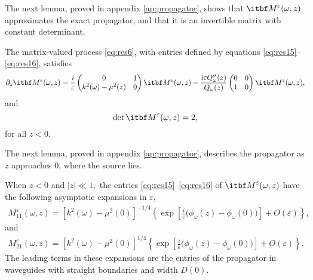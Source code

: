 \documentclass[final]{siamltex}
\begin{document}
The next lemma, proved in appendix \ref{ap:propagator}, shows that
${{\itbf M}}^{\varepsilon}({\omega},z)$ approximates the exact propagator, and that
it is an invertible matrix with constant  determinant.

\vspace{0.05in}
\begin{lemma}
\label{lem.1}
The matrix-valued process \eqref{eq:res6}, with entries defined by
equations \eqref{eq:res15}--\eqref{eq:res16}, satisfies
\begin{equation}
\partial_z {{\itbf M}}^{\varepsilon}({\omega},z) = \frac{i}{\varepsilon} \begin{pmatrix} 0 & 1
  \\ k^2({\omega}) - \mu^2(z) & 0 \end{pmatrix} {{\itbf M}}^{\varepsilon}({\omega},z)  -
\frac{i {\varepsilon} Q_{\omega}''(z)}{Q_{\omega}(z)} \begin{pmatrix} 0 & 0 \\ 1 &
  0 \end{pmatrix} {{\itbf M}}^{\varepsilon}({\omega},z), 
\label{eq:res17}
\end{equation}
and 
\begin{equation}
\det {{\itbf M}}^{\varepsilon}({\omega},z) = 2, 
\label{eq:res18}
\end{equation}
for all $ z < 0$.
\end{lemma}

\vspace{0.05in} The next lemma, proved in appendix
\ref{ap:propagator}, describes the propagator as $z$ approaches $0$,
where the source lies.
\vspace{0.05in}
\begin{lemma}
\label{lem.2}
When $z<0$ and $|z| \ll 1,$ the entries
\eqref{eq:res15}--\eqref{eq:res16} of ${{\itbf M}}^{\varepsilon}({\omega},z)$ have the
following asymptotic expansions in ${\varepsilon}$,
\begin{align*}
M_{11}^{\varepsilon}({\omega},z) = [k^2({\omega})-\mu^2(0)]^{-1/4} \left\{ \exp \left[ \frac{i}{\varepsilon} 
\big( \phi_{\omega}(z)-\phi_{\omega}(0)\big)\right] + O({\varepsilon}) \right\},
\end{align*}
and 
\begin{align*}
M_{21}^{\varepsilon}({\omega},z) = [k^2({\omega})-\mu^2(0)]^{1/4} \left\{ \exp \left[
  \frac{i}{\varepsilon} \big( \phi_{\omega}(z)-\phi_{\omega}(0)\big)\right] + O({\varepsilon})
\right\}.
\end{align*}
The leading terms in these expansions are the entries of the
propagator in waveguides with straight boundaries and width $D(0)$.
\end{lemma}
\end{document}
